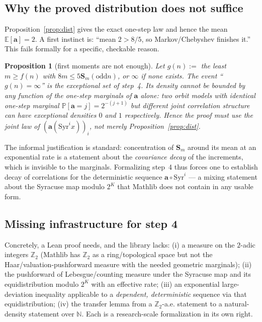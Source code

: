 \documentclass[11pt]{article}
\theoremstyle{plain}
\newtheorem{prop}[thm]{Proposition}
\theoremstyle{definition}
\theoremstyle{remark}
\newcommand{\N}{\mathbb{N}}
\newcommand{\Z}{\mathbb{Z}}
\newcommand{\Ztwo}{\Z_2}
\newcommand{\Syr}{\mathrm{Syr}}
\newcommand{\aval}{\mathbf{a}}
\newcommand{\Ssum}{\mathbf{S}}
\newcommand{\E}{\mathbb{E}}
\newcommand{\Prob}{\mathbb{P}}
\newcommand{\odd}{\mathrm{odd}}
\begin{document}
\subsection{Why the proved distribution does not suffice}

Proposition~\ref{prop:dist} gives the exact one-step law and hence the mean
$\E[\aval]=2$. A first instinct is: ``mean $2>8/5$, so Markov/Chebyshev finishes
it.'' This fails formally for a specific, checkable reason.

\begin{prop}[first moments are not enough]\label{prop:firstmoment}
Let $g(n):=$ the least $m\ge f(n)$ with $8m\le 5\Ssum_m(\odd n)$, or $\infty$ if
none exists. The event ``$g(n)=\infty$'' is the exceptional set of step~4. Its
density cannot be bounded by any function of the one-step marginals of $\aval$
alone: two orbit models with identical one-step marginal
$\Prob[\aval=j]=2^{-(j+1)}$ but different \emph{joint} correlation structure can
have exceptional densities $0$ and $1$ respectively. Hence the proof must use the
joint law of $(\aval(\Syr^i x))_i$, not merely Proposition~\ref{prop:dist}.
\end{prop}

The informal justification is standard: concentration of $\Ssum_m$ around its
mean at an exponential rate is a statement about the \emph{covariance decay} of
the increments, which is invisible to the marginals. Formalizing step~4 thus
forces one to establish decay of correlations for the deterministic sequence
$\aval\circ\Syr^i$ --- a mixing statement about the Syracuse map modulo $2^K$
that Mathlib does not contain in any usable form.

\subsection{Missing infrastructure for step 4}
Concretely, a Lean proof needs, and the library lacks: (i) a measure on the
$2$-adic integers $\Ztwo$ (Mathlib has $\Ztwo$ as a ring/topological space but
not the Haar/valuation-pushforward measure with the needed geometric marginals);
(ii) the pushforward of Lebesgue/counting measure under the Syracuse map and its
equidistribution modulo $2^K$ with an effective rate; (iii) an exponential
large-deviation inequality applicable to a \emph{dependent, deterministic}
sequence via that equidistribution; (iv) the transfer lemma from a $\Ztwo$-a.e.
statement to a natural-density statement over $\N$. Each is a research-scale
formalization in its own right.
\end{document}
